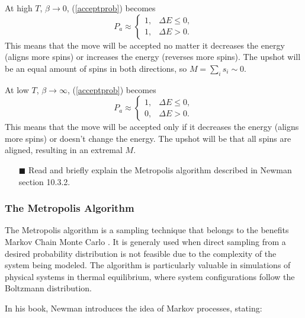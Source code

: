 \documentclass[11pt]{article}
\begin{document}
At high $T$, $\beta \rightarrow 0$, (\ref{acceptprob}) becomes
\begin{equation}
    P_a \approx \begin{cases}
        1, & \Delta E \leq 0, \\
        1, & \Delta E > 0.
    \end{cases}
\end{equation}
This means that the move will be accepted no matter it decreases the energy (aligns more spins) or increases the energy (reverses more spins). The upshot will be an equal amount of spins in both directions, so $M = \sum_i s_i \sim 0$.

At low $T$, $\beta \rightarrow \infty$, (\ref{acceptprob}) becomes
\begin{equation}
    P_a \approx \begin{cases}
        1, & \Delta E \leq 0, \\
        0, & \Delta E > 0.
    \end{cases}
\end{equation}
This means that the move will be accepted only if it decreases the energy (aligns more spins) or doesn't change the energy. The upshot will be that all spins are aligned, resulting in an extremal $M$.

\begin{itemize}
    \item[$\blacksquare$] Read and briefly explain the Metropolis algorithm described in Newman section 10.3.2.
\end{itemize}

\subsubsection*{The Metropolis Algorithm}

The Metropolis algorithm is a sampling technique that belongs to the benefits Markov Chain Monte Carlo . It is generaly used when direct sampling from a desired probability distribution is not feasible due to the complexity of the system being modeled. The algorithm is particularly valuable in simulations of physical systems in thermal equilibrium, where system configurations follow the Boltzmann distribution.

In his book, Newman introduces the idea of Markov processes, stating:

\textit{} \cite{newman1999}
\end{document}
